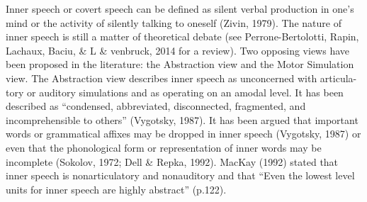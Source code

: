 \documentclass[12pt,]{book}
\begin{document}
Inner speech or covert speech can be defined as silent verbal production
in one's mind or the activity of silently talking to oneself (Zivin,
1979). The nature of inner speech is still a matter of theoretical
debate (see Perrone-Bertolotti, Rapin, Lachaux, Baciu, \& L \& venbruck,
2014 for a review). Two opposing views have been proposed in the
literature: the Abstraction view and the Motor Simulation view. The
Abstraction view describes inner speech as unconcerned with articula-
tory or auditory simulations and as operating on an amodal level. It has
been described as ``condensed, abbreviated, disconnected, fragmented,
and incomprehensible to others'' (Vygotsky, 1987). It has been argued
that important words or grammatical affixes may be dropped in inner
speech (Vygotsky, 1987) or even that the phonological form or
representation of inner words may be incomplete (Sokolov, 1972; Dell \&
Repka, 1992). MacKay (1992) stated that inner speech is nonarticulatory
and nonauditory and that ``Even the lowest level units for inner speech
are highly abstract'' (p.122).
\end{document}
